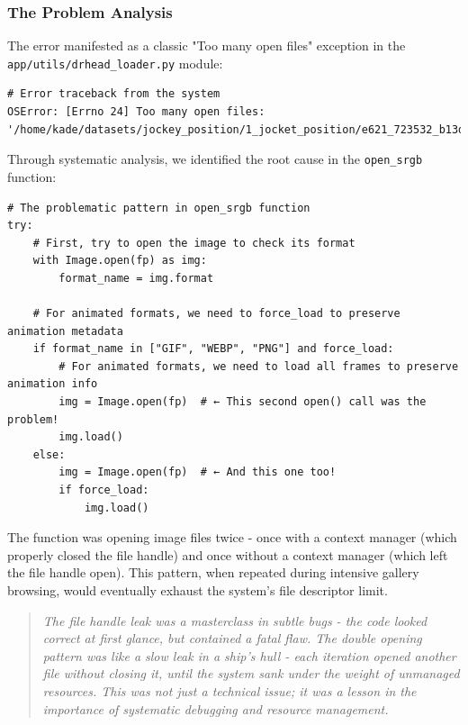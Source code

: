 \documentclass[11pt]{article}
\begin{document}
\subsubsection{The Problem Analysis}

The error manifested as a classic "Too many open files" exception in the \texttt{app/utils/drhead_loader.py} module:

\begin{lstlisting}[style=python]
# Error traceback from the system
OSError: [Errno 24] Too many open files: '/home/kade/datasets/jockey_position/1_jocket_position/e621_723532_b13d1803e965e2a9e88f13927156207a.jpg'
\end{lstlisting}

Through systematic analysis, we identified the root cause in the \texttt{open\_srgb} function:

\begin{lstlisting}[style=python]
# The problematic pattern in open_srgb function
try:
    # First, try to open the image to check its format
    with Image.open(fp) as img:
        format_name = img.format

    # For animated formats, we need to force_load to preserve animation metadata
    if format_name in ["GIF", "WEBP", "PNG"] and force_load:
        # For animated formats, we need to load all frames to preserve animation info
        img = Image.open(fp)  # ← This second open() call was the problem!
        img.load()
    else:
        img = Image.open(fp)  # ← And this one too!
        if force_load:
            img.load()
\end{lstlisting}

The function was opening image files twice - once with a context manager (which properly closed the file handle) and once without a context manager (which left the file handle open). This pattern, when repeated during intensive gallery browsing, would eventually exhaust the system's file descriptor limit.

\begin{quote}
\emph{The file handle leak was a masterclass in subtle bugs - the code looked correct at first glance, but contained a fatal flaw. The double opening pattern was like a slow leak in a ship's hull - each iteration opened another file without closing it, until the system sank under the weight of unmanaged resources. This was not just a technical issue; it was a lesson in the importance of systematic debugging and resource management.}
\end{quote}
\end{document}
